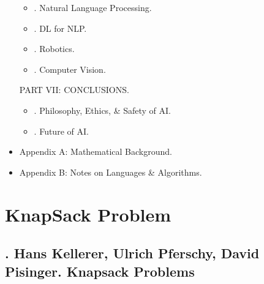 \documentclass{article}
\begin{document}
\begin{itemize}
\begin{itemize}
		\item {. Natural Language Processing.}
		\item {. DL for NLP.}
		\item {. Robotics.}
		\item {. Computer Vision.}
	\end{itemize}
	PART VII: CONCLUSIONS.
	\begin{itemize}
		\item {. Philosophy, Ethics, \& Safety of AI.}
		\item {. Future of AI.}
	\end{itemize}
	\item {\sf Appendix A: Mathematical Background.}
	\item {\sf Appendix B: Notes on Languages \& Algorithms.}
\end{itemize}


\section{KnapSack Problem}


\subsection{\cite{Kellerer_Pferschy_Pisinger2004}. {\sc Hans Kellerer, Ulrich Pferschy, David Pisinger}. Knapsack Problems}
\end{document}

